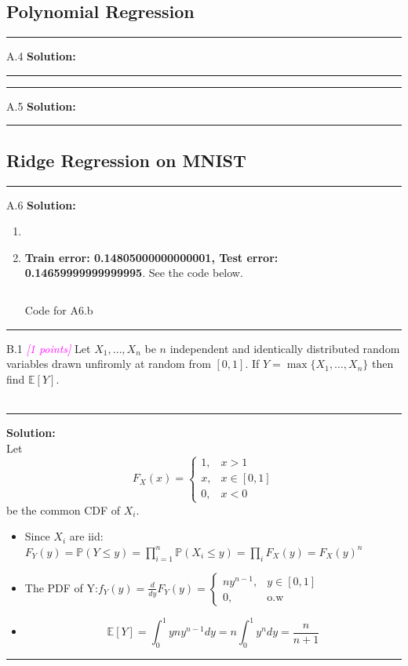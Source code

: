 \documentclass{article}
\newcommand{\1}{\mathbf{1}}
\newcommand{\E}{\mathbb{E}}
\renewcommand{\P}{\mathbb{P}}
\newcommand{\points}[1]{\small\textcolor{magenta}{\emph{[#1 points]}} \normalsize}
\begin{document}
\subsection*{Polynomial Regression}

\noindent\rule{\textwidth}{1pt}
A.4 {\bf Solution:}\\
\noindent\rule{\textwidth}{1pt}
    
\noindent\rule{\textwidth}{1pt}
A.5 {\bf Solution:}\\

\noindent\rule{\textwidth}{1pt}

\subsection*{Ridge Regression on MNIST}
\noindent\rule{\textwidth}{1pt}
A.6 {\bf Solution:}\\
\begin{enumerate}
    \item 
    \item {\bf Train error: 0.14805000000000001, Test error: 0.14659999999999995}. See the code below. 
          \inputminted{python}{code/A6_b.py}
          \caption{Code for A6.b}
          \label{listing:a6.b}
\end{enumerate}
\noindent\rule{\textwidth}{1pt}
 

B.1  \points{1} Let $X_1,\dots,X_n$ be $n$ independent and identically distributed random variables drawn unfiromly at random from $[0,1]$. If $Y = \max\{X_1,\dots,X_n\}$ then find $\E[Y]$.\\
\\
    \noindent\rule{\textwidth}{1pt}
    {\bf Solution:}\\
    Let $$F_X(x) = 
    \begin{cases}
    1, & x>1\\
    x, & x\in[0,1]\\
    0, & x<0
    \end{cases}
    $$ be the common CDF of $X_i$.
    \begin{itemize}
        \item Since $X_i$ are iid: $F_Y(y) = \P(Y \leq y) = \prod_{i=1}^n\P(X_i \le y) = \prod_i F_X(y) = F_X(y)^n$
        \item The PDF of Y:$f_Y(y) = \frac{d}{dy}F_Y(y) = \begin{cases}
    ny^{n-1}, & y\in[0,1]\\
    0, & \text{o.w}
    \end{cases}  $
    \item $$\boxed{\E[Y] = \int_0^1 yny^{n-1}dy = n\int_0^1 y^{n}dy = \frac{n}{n+1} }$$
    \end{itemize}
    \noindent\rule{\textwidth}{1pt}
\end{document}
